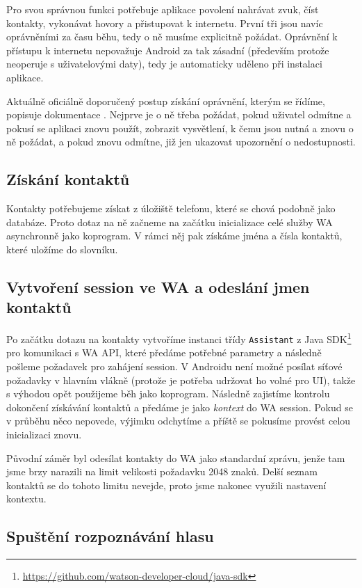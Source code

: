 Pro svou správnou funkci potřebuje aplikace povolení nahrávat zvuk, číst
kontakty, vykonávat hovory a přistupovat k internetu. První
tři jsou navíc oprávněními za času běhu, tedy o ně musíme explicitně
požádat. Oprávnění k přístupu k internetu nepovažuje Android za tak zásadní (především
protože neoperuje s uživatelovými daty), tedy je automaticky
uděleno při instalaci aplikace.

Aktuálně oficiálně doporučený postup získání oprávnění, kterým se řídíme, popisuje
dokumentace \citet{android_request_permissions}. Nejprve je o ně třeba
požádat, pokud uživatel odmítne a pokusí se
aplikaci znovu použít, zobrazit vysvětlení, k čemu jsou nutná a znovu o ně
požádat, a pokud znovu odmítne, již jen ukazovat upozornění o nedostupnosti.

\subsection{Získání kontaktů}

Kontakty potřebujeme získat z úložiště telefonu, které se chová podobně jako
databáze. Proto dotaz na ně začneme na začátku inicializace celé služby WA
asynchronně jako koprogram. V rámci něj pak získáme jména a čísla kontaktů,
které uložíme do slovníku.

\subsection{Vytvoření session ve WA a odeslání jmen kontaktů}

Po začátku dotazu na kontakty vytvoříme instanci třídy \texttt{Assistant}
z Java SDK\footnote{\url{https://github.com/watson-developer-cloud/java-sdk}}
pro komunikaci s WA API, které předáme potřebné parametry a následně pošleme
požadavek pro zahájení session. V Androidu není možné posílat síťové požadavky
v hlavním vlákně (protože je potřeba udržovat ho volné pro UI), takže s výhodou
opět použijeme běh jako koprogram. Následně zajistíme
kontrolu dokončení získávání kontaktů a předáme je jako \textit{kontext} do
WA session. Pokud se v průběhu něco nepovede, výjimku odchytíme a příště
se pokusíme provést celou inicializaci znovu.

Původní záměr byl odesílat kontakty do WA jako standardní zprávu, jenže
tam jsme brzy narazili na limit velikosti požadavku 2048 znaků. Delší
seznam kontaktů se do tohoto limitu nevejde, proto jsme nakonec využili
nastavení kontextu.

\subsection{Spuštění rozpoznávání hlasu}

